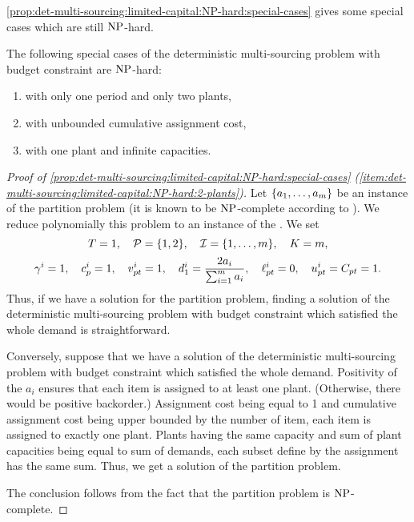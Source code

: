 \cref{prop:det-multi-sourcing:limited-capital:NP-hard:special-cases} gives some special cases which are still $\operatorname{NP}$-hard.



\begin{prop}\label{prop:det-multi-sourcing:limited-capital:NP-hard:special-cases}
  The following special cases of the deterministic multi-sourcing problem with budget constraint are $\operatorname{NP}$-hard:
  \begin{enumerate}
    \item\label{item:det-multi-sourcing:limited-capital:NP-hard:2-plants}
    with only one period and only two plants,
    \item\label{item:det-multi-sourcing:limited-capital:NP-hard:unbounded-assignment-cost}
    with unbounded cumulative assignment cost,
    \item\label{item:det-multi-sourcing:limited-capital:NP-hard:infinite-capacities}
    with one plant and infinite capacities.
  \end{enumerate}
\end{prop}


\begin{proof}[Proof of \cref{prop:det-multi-sourcing:limited-capital:NP-hard:special-cases} (\cref{item:det-multi-sourcing:limited-capital:NP-hard:2-plants})]
Let $\crbracket{a_1,\ldots,a_m}$ be an instance of the partition problem (it is known to be $\operatorname{NP}$-complete according to \citet{Garey1979}).
We reduce polynomially this problem to an instance of the \tbc.
We set
$$
  \horizon=1
  ,\quad
  \plants=\crbracket{1,2}
  ,\quad
  \REF=\range[1]{m}
  ,\quad
  \capital = m,
$$
$$
  \gamma^i=1
  ,\quad
  c_p^i=1
  ,\quad
  v_{pt}^i=1
  ,\quad
  d_1^i=\frac{2a_i}{\sum_{i=1}^{m}a_i}
  ,\quad
  \ell_{pt}^i=0
  ,\quad
  u_{pt}^i=C_{pt}=1.
$$
Thus, if we have a solution for the partition problem, finding a solution of the deterministic multi-sourcing problem with budget constraint which satisfied the whole demand is straightforward.

Conversely, suppose that we have a solution of the deterministic multi-sourcing problem with budget constraint which satisfied the whole demand.
Positivity of the $a_i$ ensures that each item is assigned to at least one plant.
(Otherwise, there would be positive backorder.)
Assignment cost being equal to 1 and cumulative assignment cost being upper bounded by the number of item, each item is assigned to exactly one plant.
Plants having the same capacity and sum of plant capacities being equal to sum of demands, each subset define by the assignment has the same sum.
Thus, we get a solution of the partition problem.

The conclusion follows from the fact that the partition problem is $\operatorname{NP}$-complete.
\end{proof}



